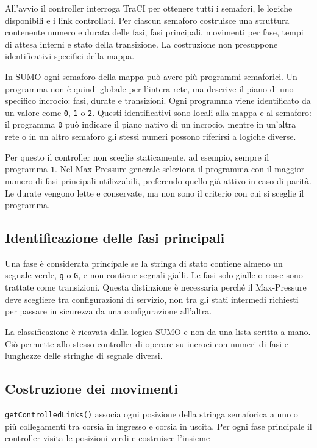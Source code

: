 \documentclass[12pt,a4paper,oneside]{report}
\numberwithin{equation}{chapter}
\begin{document}
All'avvio il controller interroga TraCI per ottenere tutti i semafori, le
logiche disponibili e i link controllati. Per ciascun semaforo costruisce una
struttura contenente numero e durata delle fasi, fasi principali, movimenti per
fase, tempi di attesa interni e stato della transizione. La costruzione non
presuppone identificativi specifici della mappa.

In SUMO ogni semaforo della mappa può avere più programmi semaforici. Un
programma non è quindi globale per l'intera rete, ma descrive il piano di uno
specifico incrocio: fasi, durate e transizioni. Ogni programma viene identificato
da un valore come \texttt{0}, \texttt{1} o \texttt{2}. Questi identificativi sono
locali alla mappa e al semaforo: il programma \texttt{0} può indicare il piano
nativo di un incrocio, mentre in un'altra rete o in un altro semaforo gli stessi
numeri possono riferirsi a logiche diverse.

Per questo il controller non sceglie staticamente, ad esempio, sempre il
programma \texttt{1}. Nel Max-Pressure generale seleziona il programma con il
maggior numero di fasi principali utilizzabili, preferendo quello già attivo in
caso di parità. Le durate vengono lette e conservate, ma non sono il criterio
con cui si sceglie il programma.

\subsection{Identificazione delle fasi principali}

Una fase è considerata principale se la stringa di stato contiene almeno un
segnale verde, \texttt{g} o \texttt{G}, e non contiene segnali gialli. Le fasi
solo gialle o rosse sono trattate come transizioni. Questa distinzione è
necessaria perché il Max-Pressure deve scegliere tra configurazioni di servizio,
non tra gli stati intermedi richiesti per passare in sicurezza da una
configurazione all'altra.

La classificazione è ricavata dalla logica SUMO e non da una lista scritta a
mano. Ciò permette allo stesso controller di operare su incroci con numeri di
fasi e lunghezze delle stringhe di segnale diversi.

\subsection{Costruzione dei movimenti}

\texttt{getControlledLinks()} associa ogni posizione della stringa semaforica
a uno o più collegamenti tra corsia in ingresso e corsia in uscita. Per ogni
fase principale il controller visita le posizioni verdi e costruisce
l'insieme
\end{document}
